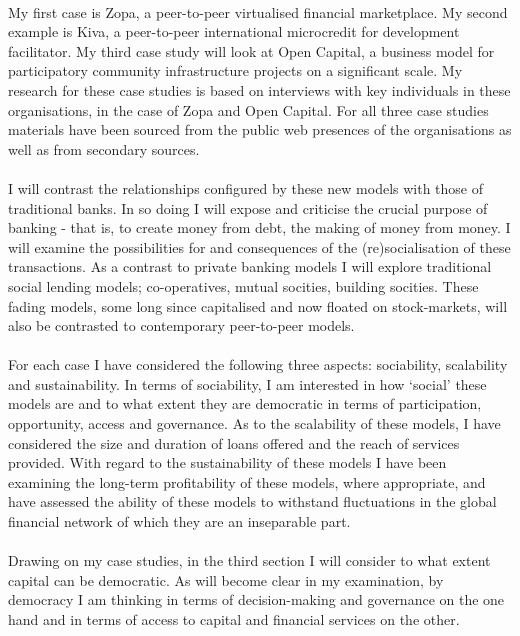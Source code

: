 \documentclass[12pt,a4paper,titlepage]{article}
\begin{document}
\paragraph{}My first case is Zopa, a peer-to-peer virtualised financial marketplace. My second example is Kiva, a peer-to-peer international microcredit for development facilitator. My third case study will look at Open Capital, a business model for participatory community infrastructure projects on a significant scale. My research for these case studies is based on interviews with key individuals in these organisations, in the case of Zopa and Open Capital. For all three case studies materials have been sourced from the public web presences of the organisations as well as from secondary sources.

\paragraph{}I will contrast the relationships configured by these new models with  those of traditional banks. In so doing I will expose and criticise the crucial purpose of banking - that is, to create money from debt, the making of money from money. I will examine the possibilities for and consequences of the (re)socialisation of these transactions. As a contrast to private banking models I will explore traditional social lending models; co-operatives, mutual socities, building socities. These fading models, some long since capitalised and now floated on stock-markets, will also be contrasted to contemporary peer-to-peer models.

\paragraph{}For each case I have considered the following three aspects: sociability, scalability and sustainability. In terms of sociability, I am interested in how `social' these models are and to what extent they are democratic in terms of participation, opportunity, access and governance. As to the scalability of these models, I have considered the size and duration of loans offered and the reach of services provided. With regard to the sustainability of these models I have been examining the long-term profitability of these models, where appropriate, and have assessed the ability of these models to withstand fluctuations in the global financial network of which they are an inseparable part.

\paragraph{}Drawing on my case studies, in the third section I will consider to what extent capital can be democratic. As will become clear in my examination, by democracy I am thinking in terms of decision-making and governance on the one hand and in terms of access to capital and financial services on the other.
\end{document}
